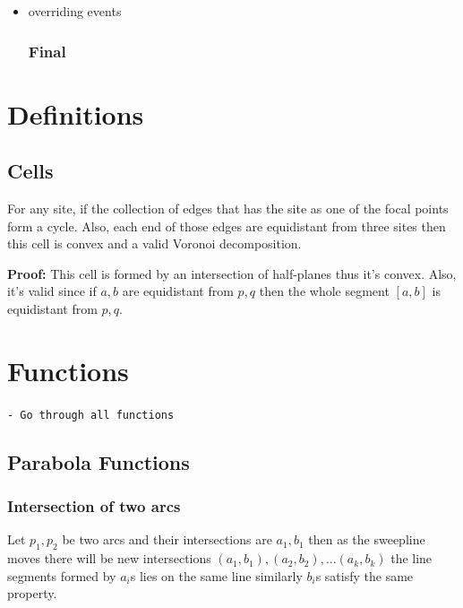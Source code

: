 \documentclass{article}
\begin{document}
\begin{enumerate}
\begin{itemize}
\begin{displayquote}
\begin{itemize}
\begin{displayquote}
\begin{itemize}
                \end{itemize}
                
              \end{displayquote}
            \end{itemize}
            \end{displayquote}
    \item overriding events 
   
   \subsubsection{{\color{black} Final}}
 
    \end{itemize}
    
\end{enumerate}

\section{Definitions}

\subsection{Cells} For any site, if the collection of edges that has the site as one of the focal points form a cycle. Also, each end of those edges are equidistant from three sites then this cell is convex and a valid Voronoi decomposition.

\textbf{Proof:}
    This cell is formed by an intersection of half-planes thus it's convex. Also, it's valid since if $a, b$ are equidistant from $p, q$ then the whole segment $[a, b]$ is equidistant  from $p, q$. %
    
\section{Functions}
{\color{red} \tt - Go through all functions}
\subsection{Parabola Functions}
\subsubsection{Intersection of two arcs}
Let $p_1, p_2$ be two arcs and their intersections are $a_1, b_1$ then as the sweepline moves there will be new intersections $\left(a_1, b_1\right),\left(a_2, b_2\right),\dots \left(a_k, b_k\right)$ the line segments formed by $a_i$s lies on the same line similarly  $b_i$s satisfy the same property.
\end{document}
